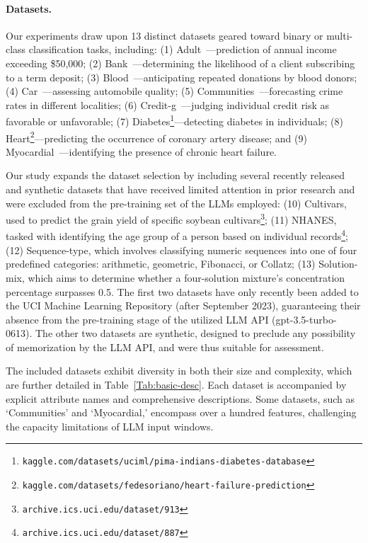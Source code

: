 \paragraph{Datasets.}
Our experiments draw upon 13 distinct datasets geared toward binary or multi-class classification tasks, including: (1) Adult~\cite{asuncion2007uci}—prediction of annual income exceeding \$50,000; (2) Bank~\cite{moro2014data}—determining the likelihood of a client subscribing to a term deposit; (3) Blood~\cite{yeh2009knowledge}—anticipating repeated donations by blood donors; (4) Car~\cite{kadra2021well}—assessing automobile quality; (5) Communities~\cite{misc_communities_and_crime_183}—forecasting crime rates in different localities; (6) Credit-g~\cite{kadra2021well}—judging individual credit risk as favorable or unfavorable; (7) Diabetes\footnote{\texttt{kaggle.com/datasets/uciml/pima-indians-diabetes-database}}—detecting diabetes in individuals; (8) Heart\footnote{\texttt{kaggle.com/datasets/fedesoriano/heart-failure-prediction}}—predicting the occurrence of coronary artery disease; and (9) Myocardial~\cite{misc_myocardial_infarction_complications_579}—identifying the presence of chronic heart failure.

Our study expands the dataset selection by including several recently released and synthetic datasets that have received limited attention in prior research and were excluded from the pre-training set of the LLMs employed: (10) Cultivars, used to predict the grain yield of specific soybean cultivars\footnote{\texttt{archive.ics.uci.edu/dataset/913}}; (11) NHANES, tasked with identifying the age group of a person based on individual records\footnote{\texttt{archive.ics.uci.edu/dataset/887}}; (12) Sequence-type, which involves classifying numeric sequences into one of four predefined categories: arithmetic, geometric, Fibonacci, or Collatz; (13) Solution-mix, which aims to determine whether a four-solution mixture's concentration percentage surpasses 0.5. The first two datasets have only recently been added to the UCI Machine Learning Repository (after September 2023), guaranteeing their absence from the pre-training stage of the utilized LLM API (gpt-3.5-turbo-0613). The other two datasets are synthetic, designed to preclude any possibility of memorization by the LLM API, and were thus suitable for assessment.

The included datasets exhibit diversity in both their size and complexity, which are further detailed in Table~\ref{Tab:basic-desc}. Each dataset is accompanied by explicit attribute names and comprehensive descriptions. Some datasets, such as `Communities' and `Myocardial,' encompass over a hundred features, challenging the capacity limitations of LLM input windows.


